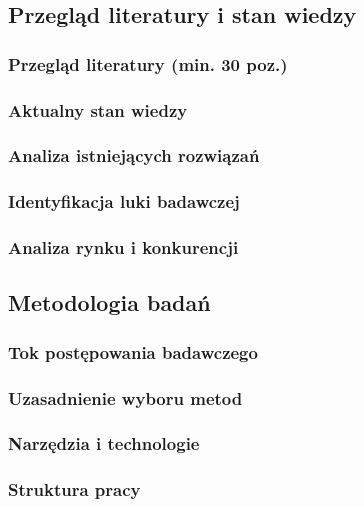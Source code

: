\subsection{Przegląd literatury i stan wiedzy}
\subsubsection*{Przegląd literatury (min. 30 poz.)}
\subsubsection*{Aktualny stan wiedzy}
\subsubsection*{Analiza istniejących rozwiązań}
\subsubsection*{Identyfikacja luki badawczej}
\subsubsection*{Analiza rynku i konkurencji}

\subsection{Metodologia badań}
\subsubsection*{Tok postępowania badawczego}
\subsubsection*{Uzasadnienie wyboru metod}
\subsubsection*{Narzędzia i technologie}
\subsubsection*{Struktura pracy}
